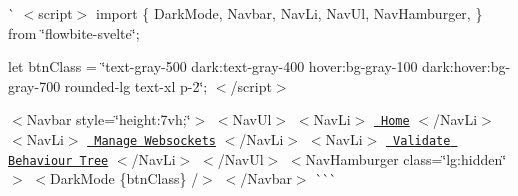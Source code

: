 \`{} $<$script$>$ import \{ Dark\+Mode, Navbar, Nav\+Li, Nav\+Ul, Nav\+Hamburger, \} from \char`\"{}flowbite-\/svelte\char`\"{};

let btn\+Class = \char`\"{}text-\/gray-\/500 dark\+:text-\/gray-\/400 hover\+:bg-\/gray-\/100 dark\+:hover\+:bg-\/gray-\/700 rounded-\/lg text-\/xl p-\/2\char`\"{}; $<$/script$>$

$<$\+Navbar style=\char`\"{}height\+:7vh;\char`\"{}$>$ $<$\+Nav\+Ul$>$ $<$\+Nav\+Li$>$ \href{\#/}{\texttt{ Home}} $<$/\+Nav\+Li$>$ $<$\+Nav\+Li$>$ \href{\#/websocket}{\texttt{ Manage Websockets}} $<$/\+Nav\+Li$>$ $<$\+Nav\+Li$>$ \href{\#/validate}{\texttt{ Validate Behaviour Tree}} $<$/\+Nav\+Li$>$ $<$/\+Nav\+Ul$>$ $<$\+Nav\+Hamburger class=\char`\"{}lg\+:hidden\char`\"{} $>$ \texorpdfstring{$<$}{<}Dark\+Mode \{btn\+Class\} /\texorpdfstring{$>$}{>} $<$/\+Navbar$>$ \`{}\`{}\`{} 